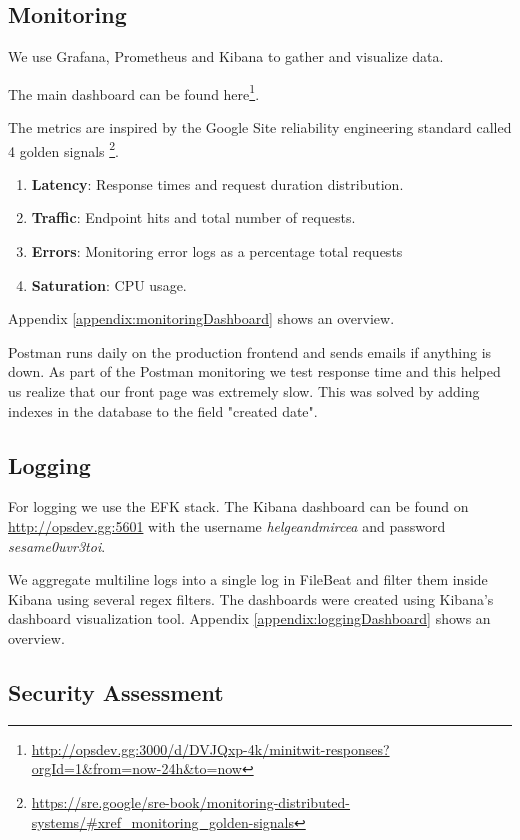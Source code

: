 \documentclass{article}
\begin{document}
\subsection{Monitoring}

We use Grafana, Prometheus and Kibana to gather and visualize data.

The main dashboard can be found here\footnote{\url{http://opsdev.gg:3000/d/DVJQxp-4k/minitwit-responses?orgId=1&from=now-24h&to=now}}.

The metrics are inspired by the Google Site reliability engineering standard called 4 golden signals \footnote{\url{https://sre.google/sre-book/monitoring-distributed-systems/\#xref_monitoring_golden-signals}}.

\begin{enumerate}
    \item \textbf{Latency}: Response times and request duration distribution.
    \item \textbf{Traffic}: Endpoint hits and total number of requests.
    \item \textbf{Errors}: Monitoring error logs as a percentage total requests
    \item \textbf{Saturation}: CPU usage.
\end{enumerate}
Appendix \ref{appendix:monitoringDashboard} shows an overview. 
\newline

Postman runs daily on the production frontend and sends emails if anything is down. As part of the Postman monitoring we test response time and this helped us realize that our front page was extremely slow. This was solved by adding indexes in the database to the field "created date". 

\subsection{Logging}

For logging we use the EFK stack. The Kibana dashboard can be found on \url{http://opsdev.gg:5601} with the username \emph{helgeandmircea} and password \emph{sesame0uvr3toi}. 

We aggregate multiline logs into a single log in FileBeat and filter them inside Kibana using several regex filters. The dashboards were created using Kibana's dashboard visualization tool. Appendix \ref{appendix:loggingDashboard} shows an overview.


\subsection{Security Assessment}
\end{document}
